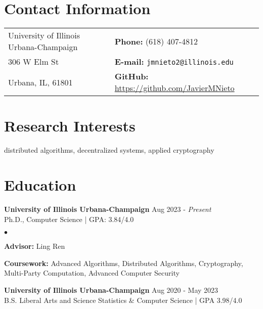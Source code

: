\documentclass[margin,line]{res}
\newenvironment{list1}{
  \begin{list}{\ding{113}}{%
      \setlength{\itemsep}{0in}
      \setlength{\parsep}{0in} \setlength{\parskip}{0in}
      \setlength{\topsep}{0in} \setlength{\partopsep}{0in} 
      \setlength{\leftmargin}{0.17in}}}{\end{list}}
\newenvironment{list2}{
  \begin{list}{$\bullet$}{%
      \setlength{\itemsep}{0in}
      \setlength{\parsep}{0in} \setlength{\parskip}{0in}
      \setlength{\topsep}{0in} \setlength{\partopsep}{0in} 
      \setlength{\leftmargin}{0.2in}}}{\end{list}}
\begin{document}

\begin{resume}
  \section{\sc Contact Information}
  \vspace{.05in}
  \begin{tabular}{@{}p{3in}p{4in}}
    University of Illinois Urbana-Champaign & {\bf Phone:}   (618) 407-4812                       \\
    306 W Elm St                            & {\bf E-mail:}  {\tt jmnieto2@illinois.edu}          \\
    Urbana, IL, 61801                       & {\bf GitHub:} \url{https://github.com/JavierMNieto} \\
  \end{tabular}


  \section{\sc Research Interests}
  distributed algorithms, decentralized systems, applied cryptography

  \section{\sc Education}
   {\bf University of Illinois Urbana-Champaign} \hfill Aug 2023 - \emph{Present}\\
  Ph.D., Computer Science | GPA: 3.84/4.0
  \begin{list2}
    \item {\bf \small Advisor:}  Ling Ren
    \item {\bf \small Coursework:} Advanced Algorithms, Distributed Algorithms, Cryptography, Multi-Party Computation, Advanced Computer Security
  \end{list2}

  {\bf University of Illinois Urbana-Champaign} \hfill Aug 2020 - May 2023\\
  B.S. Liberal Arts and Science Statistics \& Computer Science | GPA 3.98/4.0


\end{resume}
\end{document}
